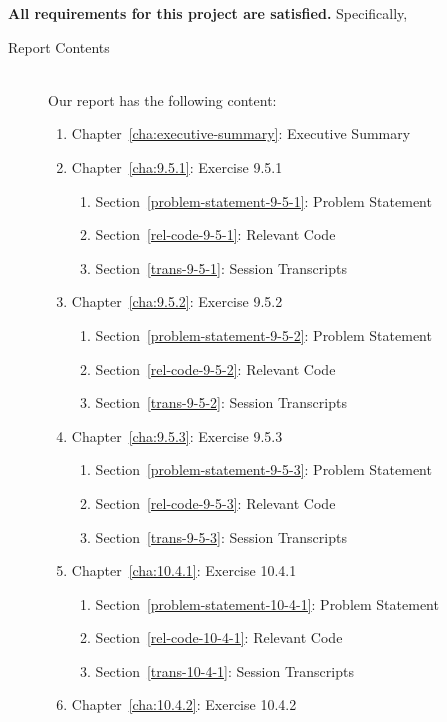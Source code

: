 \documentclass{report}
\begin{document}
\textbf{All requirements for this project are satisfied.}
Specifically,
\begin{description}
\item[Report Contents] \ \\
  Our report has the following content:
  \begin{enumerate}[{}]
  \item Chapter~\ref{cha:executive-summary}: Executive Summary
  \item Chapter~\ref{cha:9.5.1}: Exercise 9.5.1
    \begin{enumerate}[{}]
    \item Section~\ref{problem-statement-9-5-1}: Problem Statement
    \item Section~\ref{rel-code-9-5-1}: Relevant Code 
    \item Section~\ref{trans-9-5-1}: Session Transcripts
    \end{enumerate}
  \item Chapter~\ref{cha:9.5.2}: Exercise 9.5.2
    \begin{enumerate}[{}]
    \item Section~\ref{problem-statement-9-5-2}: Problem Statement
    \item Section~\ref{rel-code-9-5-2}: Relevant Code
    \item Section~\ref{trans-9-5-2}: Session Transcripts
    \end{enumerate}
  \item Chapter~\ref{cha:9.5.3}: Exercise 9.5.3
    \begin{enumerate}[{}]
    \item Section~\ref{problem-statement-9-5-3}: Problem Statement
    \item Section~\ref{rel-code-9-5-3}: Relevant Code
    \item Section~\ref{trans-9-5-3}: Session Transcripts
    \end{enumerate}
%
 \item Chapter~\ref{cha:10.4.1}: Exercise 10.4.1
  \begin{enumerate}[{}]
    \item Section~\ref{problem-statement-10-4-1}: Problem Statement
    \item Section~\ref{rel-code-10-4-1}: Relevant Code 
    \item Section~\ref{trans-10-4-1}: Session Transcripts
    \end{enumerate}
  \item Chapter~\ref{cha:10.4.2}: Exercise 10.4.2
    \begin{enumerate}[{}]

\end{enumerate}
\end{enumerate}
\end{description}
\end{document}

